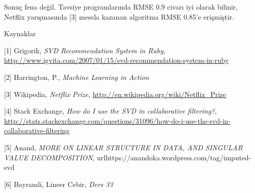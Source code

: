 \documentclass[12pt,fleqn]{article}\usepackage{../../common}
\begin{document}
Sonuç fena değil. Tavsiye programlarında RMSE 0.9 civarı iyi olarak
bilinir, Netflix yarışmasında [3] mesela kazanan algoritma RMSE 0.85'e
erişmiştir.

Kaynaklar

[1] Grigorik, {\em SVD Recommendation System in Ruby}, \url{http://www.igvita.com/2007/01/15/svd-recommendation-system-in-ruby}

[2] Harrington, P., {\em Machine Learning in Action}

[3] Wikipedia, {\em Netflix Prize}, \url{http://en.wikipedia.org/wiki/Netflix_Prize}

[4] Stack Exchange, {\em How do I use the SVD in collaborative filtering?}, \url{http://stats.stackexchange.com/questions/31096/how-do-i-use-the-svd-in-collaborative-filtering}

[5] Anand, {\em MORE ON LINEAR STRUCTURE IN DATA, AND SINGULAR VALUE
  DECOMPOSITION}, url{https://anandoka.wordpress.com/tag/imputed-svd}

[6] Bayramli, Lineer Cebir, {\em Ders 33}
\end{document}
